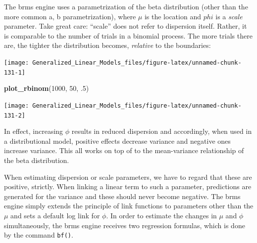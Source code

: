 \documentclass[]{svmono}
\newenvironment{Shaded}{\begin{snugshade}}{\end{snugshade}}
\newcommand{\KeywordTok}[1]{\textcolor[rgb]{0.13,0.29,0.53}{\textbf{#1}}}
\newcommand{\DataTypeTok}[1]{\textcolor[rgb]{0.13,0.29,0.53}{#1}}
\newcommand{\DecValTok}[1]{\textcolor[rgb]{0.00,0.00,0.81}{#1}}
\newcommand{\StringTok}[1]{\textcolor[rgb]{0.31,0.60,0.02}{#1}}
\newcommand{\ControlFlowTok}[1]{\textcolor[rgb]{0.13,0.29,0.53}{\textbf{#1}}}
\newcommand{\OperatorTok}[1]{\textcolor[rgb]{0.81,0.36,0.00}{\textbf{#1}}}
\newcommand{\NormalTok}[1]{#1}
\begin{document}
The brms engine uses a parametrization of the beta distribution (other
than the more common a, b parametrization), where \(\mu\) is the
location and \(phi\) is a \emph{scale} parameter. Take great care:
``scale'' does not refer to dispersion itself. Rather, it is comparable
to the number of trials in a binomial process. The more trials there
are, the tighter the distribution becomes, \emph{relative} to the
boundaries:

\begin{Shaded}
\end{Shaded}

\texttt{[image: Generalized\_Linear\_Models\_files/figure-latex/unnamed-chunk-131-1]}

\begin{Shaded}
\begin{Highlighting}[]
\KeywordTok{plot_rbinom}\NormalTok{(}\DecValTok{1000}\NormalTok{, }\DecValTok{50}\NormalTok{, .}\DecValTok{5}\NormalTok{)}
\end{Highlighting}
\end{Shaded}

\texttt{[image: Generalized\_Linear\_Models\_files/figure-latex/unnamed-chunk-131-2]}

In effect, increasing \(\phi\) results in reduced dispersion and
accordingly, when used in a distributional model, positive effects
decrease variance and negative ones increase variance. This all works on
top of to the mean-variance relationship of the beta distribution.

When estimating dispersion or scale parameters, we have to regard that
these are positive, strictly. When linking a linear term to such a
parameter, predictions are generated for the variance and these should
never become negative. The brms engine simply extends the principle of
link functions to parameters other than the \(\mu\) and sets a default
log link for \(\phi\). In order to estimate the changes in \(\mu\) and
\(\phi\) simultaneously, the brms engine receives two regression
formulas, which is done by the command \texttt{bf()}.
\end{document}
